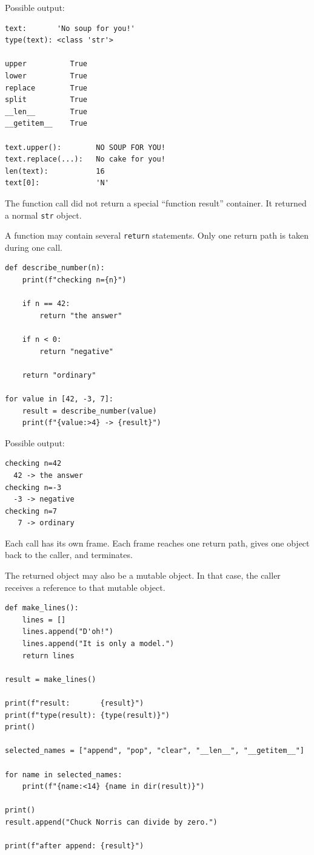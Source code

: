 Possible output:

\begin{verbatim}
text:       'No soup for you!'
type(text): <class 'str'>

upper          True
lower          True
replace        True
split          True
__len__        True
__getitem__    True

text.upper():        NO SOUP FOR YOU!
text.replace(...):   No cake for you!
len(text):           16
text[0]:             'N'
\end{verbatim}

The function call did not return a special ``function result'' container. It returned a normal \texttt{str} object.

A function may contain several \texttt{return} statements. Only one return path is taken during one call.

\begin{verbatim}
def describe_number(n):
    print(f"checking n={n}")

    if n == 42:
        return "the answer"

    if n < 0:
        return "negative"

    return "ordinary"

for value in [42, -3, 7]:
    result = describe_number(value)
    print(f"{value:>4} -> {result}")
\end{verbatim}

Possible output:

\begin{verbatim}
checking n=42
  42 -> the answer
checking n=-3
  -3 -> negative
checking n=7
   7 -> ordinary
\end{verbatim}

Each call has its own frame. Each frame reaches one return path, gives one object back to the caller, and terminates.

The returned object may also be a mutable object. In that case, the caller receives a reference to that mutable object.

\begin{verbatim}
def make_lines():
    lines = []
    lines.append("D'oh!")
    lines.append("It is only a model.")
    return lines

result = make_lines()

print(f"result:       {result}")
print(f"type(result): {type(result)}")
print()

selected_names = ["append", "pop", "clear", "__len__", "__getitem__"]

for name in selected_names:
    print(f"{name:<14} {name in dir(result)}")

print()
result.append("Chuck Norris can divide by zero.")

print(f"after append: {result}")
\end{verbatim}

